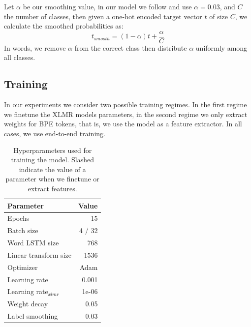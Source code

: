 \documentclass[11pt]{article}
\newcommand\citep{\cite}
\begin{document}
         Let $\alpha$ be our smoothing value, in our model we follow
     \citep{kondratyukstraka} and use $\alpha = 0.03$, and $C$ the
     number of classes, then given a one-hot encoded target vector $t$
     of size $C$, we calculate the smoothed probabilities as:
    \begin{equation}
        t_{smooth} = (1-\alpha)t + \frac{\alpha}{C}
    \end{equation}
    In words, we remove $\alpha$ from the correct class then
    distribute $\alpha$ uniformly among all classes.
     \subsection{Training}

     In our experiments we consider two possible training regimes. In
     the first regime we finetune the XLMR models parameters, in the
     second regime we only extract weights for BPE tokens, that is, we
     use the model as a feature extractor. In all cases, we use
     end-to-end training.

    	\begin{table}
		\centering
		\begin{tabular}{lr} \\
			Parameter & Value \\
			\hline
			Epochs & 15 \\
			Batch size & 4 / 32 \\
            Word LSTM size & 768 \\
            Linear transform size & 1536 \\
			Optimizer & Adam \\
			Learning rate & 0.001 \\
			Learning rate$_{xlmr}$ & 1e-06 \\
            Weight decay & 0.05 \\
			Label smoothing & 0.03 \\
		\end{tabular}
    		\caption{\label{tab:parameters} Hyperparameters used for
     training the model. Slashed indicate the value of a parameter
     when we finetune or extract features.}
	\end{table}
     
\end{document}
